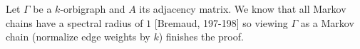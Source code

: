 Let $\Gamma$ be a $k$-orbigraph and $A$ its adjacency matrix. We know that all Markov chains have a spectral radius of $1$ [Bremaud, 197-198] so viewing $\Gamma$ as a Markov chain (normalize edge weights by $k$) finishes the proof. 